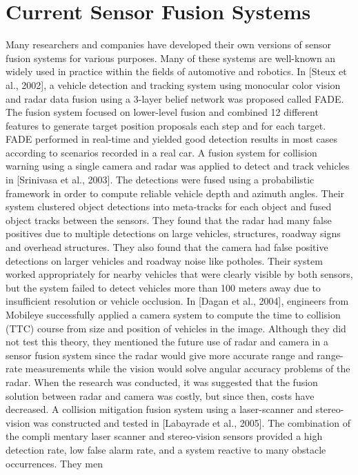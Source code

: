 \section{Current Sensor Fusion Systems}
Many researchers and companies have developed their own versions of sensor fusion
systems for various purposes. Many of these systems are well-known an widely used
in practice within the ﬁelds of automotive and robotics. In [Steux et al., 2002], a
vehicle detection and tracking system using monocular color vision and radar data
fusion using a 3-layer belief network was proposed called FADE. The fusion system
focused on lower-level fusion and combined 12 diﬀerent features to generate target
position proposals each step and for each target. FADE performed in real-time and
yielded good detection results in most cases according to scenarios recorded in a real
car.
A fusion system for collision warning using a single camera and radar was applied
to detect and track vehicles in [Srinivasa et al., 2003]. The detections were fused using
a probabilistic framework in order to compute reliable vehicle depth and azimuth
angles. Their system clustered object detections into meta-tracks for each object and
fused object tracks between the sensors. They found that the radar had many false
positives due to multiple detections on large vehicles, structures, roadway signs and overhead structures. They also found that the camera had false positive detections on
larger vehicles and roadway noise like potholes. Their system worked appropriately
for nearby vehicles that were clearly visible by both sensors, but the system failed to
detect vehicles more than 100 meters away due to insuﬃcient resolution or vehicle
occlusion.
In [Dagan et al., 2004], engineers from Mobileye successfully applied a camera
system to compute the time to collision (TTC) course from size and position of
vehicles in the image. Although they did not test this theory, they mentioned the
future use of radar and camera in a sensor fusion system since the radar would
give more accurate range and range-rate measurements while the vision would solve
angular accuracy problems of the radar. When the research was conducted, it was
suggested that the fusion solution between radar and camera was costly, but since
then, costs have decreased.
A collision mitigation fusion system using a laser-scanner and stereo-vision was
constructed and tested in [Labayrade et al., 2005]. The combination of the compli
mentary laser scanner and stereo-vision sensors provided a high detection rate, low
false alarm rate, and a system reactive to many obstacle occurrences. They men
